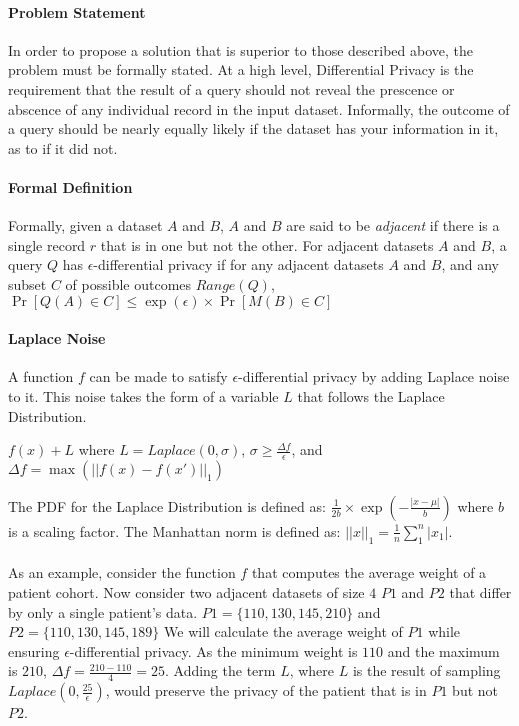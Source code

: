 \paragraph{Problem Statement}
In order to propose a solution that is superior to those described above, the problem must be formally stated. At a high level, Differential Privacy is the requirement that the result of a query should not reveal the prescence or abscence of any individual record in the input dataset. Informally, the outcome of a query should be nearly equally likely if the dataset has your information in it, as to if it did not.

\paragraph{Formal Definition}
Formally, given a dataset $A$ and $B$, $A$ and $B$ are said to be \textit{adjacent} if there is a single record $r$ that is in one but not the other. For adjacent datasets $A$ and $B$, a query $Q$ has $\epsilon$-differential privacy if for any adjacent datasets $A$ and $B$, and any subset $C$ of possible outcomes $Range(Q)$, $\Pr[Q(A) \in C] \leq \exp(\epsilon) \times \Pr[M(B) \in C]$

\paragraph{Laplace Noise}
A function $f$ can be made to satisfy $\epsilon$-differential privacy by adding Laplace noise to it. This noise takes the form of a variable $L$ that follows the Laplace Distribution. 

\bigbreak
\centerline{$f(x) + L$ where $L = Laplace(0, \sigma)$, $\sigma \geq \frac{\Delta f}{\epsilon}$, and $\Delta f = \max(||f(x) - f(x')||_1)$}
\bigbreak

The PDF for the Laplace Distribution is defined as: $\frac{1}{2b} \times \exp(-\frac{|x - \mu|}{b})$ where $b$ is a scaling factor. The Manhattan norm is defined as: $||x||_1 = \frac{1}{n} \sum_1^n |x_1|$.

\paragraph{}
As an example, consider the function $f$ that computes the average weight of a patient cohort. Now consider two adjacent datasets of size $4$ $P1$ and $P2$ that differ by only a single patient's data. $P1 = \{110, 130, 145, 210\}$ and $P2 = \{110, 130, 145, 189\}$ We will calculate the average weight of $P1$ while ensuring $\epsilon$-differential privacy. As the minimum weight is $110$ and the maximum is $210$, $\Delta f = \frac{210 - 110}{4} = 25$. Adding the term $L$, where $L$ is the result of sampling $Laplace(0, \frac{25}{\epsilon})$, would preserve the privacy of the patient that is in $P1$ but not $P2$.

